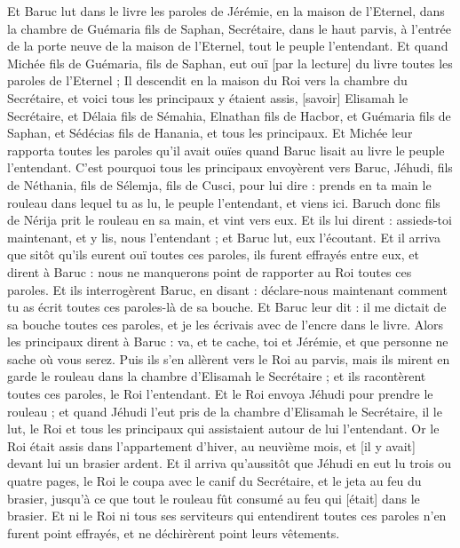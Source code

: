 \begin{multicols}{2}
Et Baruc lut dans le livre les paroles de Jérémie, en la maison de l'Eternel, dans la chambre de Guémaria fils de Saphan, Secrétaire, dans le haut parvis, à l'entrée de la porte neuve de la maison de l'Eternel, tout le peuple l'entendant.
Et quand Michée fils de Guémaria, fils de Saphan, eut ouï [par la lecture] du livre toutes les paroles de l'Eternel ;
Il descendit en la maison du Roi vers la chambre du Secrétaire, et voici tous les principaux y étaient assis, [savoir] Elisamah le Secrétaire, et Délaia fils de Sémahia, Elnathan fils de Hacbor, et Guémaria fils de Saphan, et Sédécias fils de Hanania, et tous les principaux.
Et Michée leur rapporta toutes les paroles qu'il avait ouïes quand Baruc lisait au livre le peuple l'entendant.
C'est pourquoi tous les principaux envoyèrent vers Baruc, Jéhudi, fils de Néthania, fils de Sélemja, fils de Cusci, pour lui dire : prends en ta main le rouleau dans lequel tu as lu, le peuple l'entendant, et viens ici. Baruch donc fils de Nérija prit le rouleau en sa main, et vint vers eux.
Et ils lui dirent : assieds-toi maintenant, et y lis, nous l'entendant ; et Baruc lut, eux l'écoutant.
Et il arriva que sitôt qu'ils eurent ouï toutes ces paroles, ils furent effrayés entre eux, et dirent à Baruc : nous ne manquerons point de rapporter au Roi toutes ces paroles.
Et ils interrogèrent Baruc, en disant : déclare-nous maintenant comment tu as écrit toutes ces paroles-là de sa bouche.
Et Baruc leur dit : il me dictait de sa bouche toutes ces paroles, et je les écrivais avec de l'encre dans le livre.
Alors les principaux dirent à Baruc : va, et te cache, toi et Jérémie, et que personne ne sache où vous serez.
Puis ils s'en allèrent vers le Roi au parvis, mais ils mirent en garde le rouleau dans la chambre d'Elisamah le Secrétaire ; et ils racontèrent toutes ces paroles, le Roi l'entendant.
Et le Roi envoya Jéhudi pour prendre le rouleau ; et quand Jéhudi l'eut pris de la chambre d'Elisamah le Secrétaire, il le lut, le Roi et tous les principaux qui assistaient autour de lui l'entendant.
Or le Roi était assis dans l'appartement d'hiver, au neuvième mois, et [il y avait] devant lui un brasier ardent.
Et il arriva qu'aussitôt que Jéhudi en eut lu trois ou quatre pages, le Roi le coupa avec le canif du Secrétaire, et le jeta au feu du brasier, jusqu'à ce que tout le rouleau fût consumé au feu qui [était] dans le brasier.
Et ni le Roi ni tous ses serviteurs qui entendirent toutes ces paroles n'en furent point effrayés, et ne déchirèrent point leurs vêtements.

\end{multicols}

